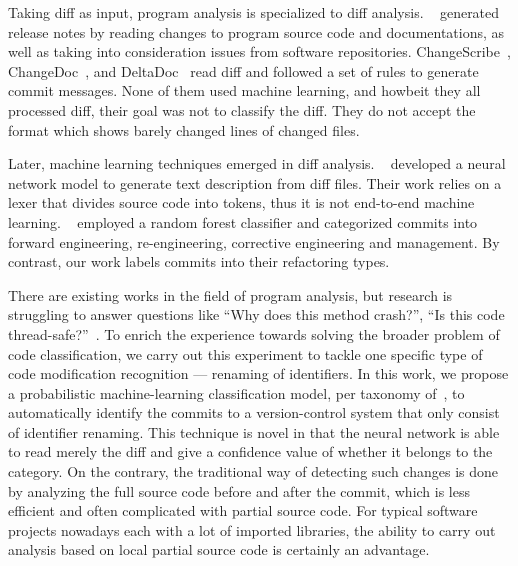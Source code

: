Taking diff as input, program analysis is specialized to diff analysis.
~\cite{moreno2016arena} generated release notes by reading changes to program source code and documentations, as well as taking into consideration issues from software repositories.
ChangeScribe~\cite{linares2015changescribe},
ChangeDoc~\cite{huang2020learning}, and
DeltaDoc~\cite{buse2010automatically} read diff and followed a set of rules to generate commit messages.
None of them used machine learning, and howbeit they all processed diff,
their goal was not to classify the diff.
They do not accept the {\gitdiff} format which shows barely changed lines of changed files.

Later, machine learning techniques emerged in diff analysis.
~\cite{loyola2017neural} developed a neural network model to generate text description from diff files.
Their work relies on a lexer that divides source code into tokens,
thus it is not end-to-end machine learning.
~\cite{macho2016predicting} employed a random forest classifier and categorized commits into forward engineering, re-engineering, corrective engineering and management.
By contrast, our work labels commits into their refactoring types.








There are existing works in the field of program analysis,
but research is struggling to answer questions like ``Why does this method crash?'', ``Is this code thread-safe?''~\cite{alexandru2017replicating}.
To enrich the experience towards solving the broader problem of code classification,
we carry out this experiment to tackle one specific type of code modification recognition
--- renaming of identifiers.
In this work, we propose a probabilistic machine-learning classification model,
per taxonomy of~\cite{allamanis2018survey},
to automatically identify the commits to a version-control system that only consist of identifier renaming.
This technique is novel in that the neural network is able to read merely the diff and give a confidence value of whether it belongs to the category.
On the contrary, the traditional way of detecting such changes is done by analyzing the full source code before and after the commit,
which is less efficient and often complicated with partial source code.
For typical software projects nowadays each with a lot of imported libraries,
the ability to carry out analysis based on local partial source code is certainly an advantage.

